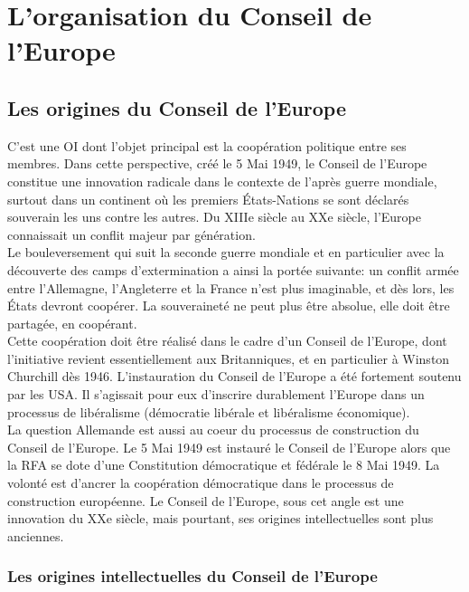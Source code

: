 \documentclass[10pt, a4paper, openany]{book}
\begin{document}
\section{L'organisation du Conseil de l'Europe}

\subsection{Les origines du Conseil de l'Europe}

C'est une OI dont l'objet principal est la coopération politique entre ses membres. Dans cette perspective, créé le 5 Mai 1949, le Conseil de l'Europe constitue une innovation radicale dans le contexte de l'après guerre mondiale, surtout dans un continent où les premiers États-Nations se sont déclarés souverain les uns contre les autres. Du XIIIe siècle au XXe siècle, l'Europe connaissait un conflit majeur par génération. \\
Le bouleversement qui suit la seconde guerre mondiale et en particulier avec la découverte des camps d'extermination a ainsi la portée suivante: un conflit armée entre l'Allemagne, l'Angleterre et la France n'est plus imaginable, et dès lors, les États devront coopérer. La souveraineté ne peut plus être absolue, elle doit être partagée, en coopérant. \\
Cette coopération doit être réalisé dans le cadre d'un Conseil de l'Europe, dont l'initiative revient essentiellement aux Britanniques, et en particulier à Winston Churchill dès 1946. L'instauration du Conseil de l'Europe a été fortement soutenu par les USA. Il s'agissait pour eux d'inscrire durablement l'Europe dans un processus de libéralisme (démocratie libérale et libéralisme économique). \\
La question Allemande est aussi au coeur du processus de construction du Conseil de l'Europe. Le 5 Mai 1949 est instauré le Conseil de l'Europe alors que la RFA se dote d'une Constitution démocratique et fédérale le 8 Mai 1949. La volonté est d'ancrer la coopération démocratique dans le processus de construction européenne. Le Conseil de l'Europe, sous cet angle est une innovation du XXe siècle, mais pourtant, ses origines intellectuelles sont plus anciennes.

\subsubsection{Les origines intellectuelles du Conseil de l'Europe}
\end{document}
